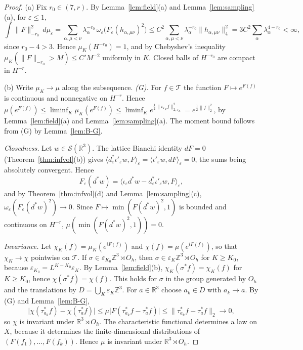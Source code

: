 \documentclass[11pt]{amsart}
\theoremstyle{plain}
\theoremstyle{definition}
\theoremstyle{remark}
\numberwithin{equation}{section}
\newcommand{\R}{\mathbb{R}}
\newcommand{\Z}{\mathbb{Z}}
\newcommand{\eps}{\varepsilon}
\newcommand{\cT}{\mathcal{T}}
\newcommand{\cS}{\mathcal{S}}
\newcommand{\Oh}{O_h}
\newcommand{\abs}[1]{\lvert #1\rvert}
\newcommand{\norm}[1]{\lVert #1\rVert}
\newcommand{\ip}[2]{\langle #1,#2\rangle}
\begin{document}
\begin{proof}
(a) Fix $r_0\in(7,r)$. By Lemma~\ref{lem:field}(a) and Lemma~\ref{lem:sampling}(a), for $\eps\le1$,
\[
\int\norm F_{-r_0}^2\,d\mu_\eps=\sum_{\alpha,\mu<\nu}\lambda_\alpha^{-r_0}\,\omega_\eps\big(F_\eps(h_{\alpha,\mu\nu})^2\big)\le C^2\sum_{\alpha,\mu<\nu}\lambda_\alpha^{-r_0}\norm{h_{\alpha,\mu\nu}}_4^2=3C^2\sum_\alpha\lambda_\alpha^{4-r_0}<\infty ,
\]
since $r_0-4>3$. Hence $\mu_K(H^{-r_0})=1$, and by Chebyshev's inequality $\mu_K(\norm F_{-r_0}>M)\le C'M^{-2}$ uniformly in $K$. Closed balls of $H^{-r_0}$ are compact in $H^{-r}$.

(b) Write $\mu_K\to\mu$ along the subsequence. \emph{(G).} For $f\in\cT$ the function $F\mapsto e^{F(f)}$ is continuous and nonnegative on $H^{-r}$. Hence $\mu(e^{F(f)})\le\liminf_K\mu_K(e^{F(f)})\le\liminf_Ke^{\frac12\norm{\iota_{\eps_K}f}^2_{2,\eps_K}}=e^{\frac12\norm f_2^2}$, by Lemma~\ref{lem:field}(a) and Lemma~\ref{lem:sampling}(a). The moment bound follows from (G) by Lemma~\ref{lem:B-G}.

\emph{Closedness.} Let $w\in\cS(\R^3)$. The lattice Bianchi identity $dF=0$ (Theorem~\ref{thm:infvol}(b)) gives $\ip{d_\eps^*\iota'_\eps w}F_\eps=\ip{\iota'_\eps w}{dF}_\eps=0$, the sums being absolutely convergent. Hence
\[
F_\eps(d^*w)=\ip{\iota_\eps d^*w-d^*_\eps\iota'_\eps w}{F}_\eps ,
\] and by Theorem~\ref{thm:infvol}(d) and Lemma~\ref{lem:sampling}(c), $\omega_\eps(F_\eps(d^*w)^2)\to0$. Since $F\mapsto\min(F(d^*w)^2,1)$ is bounded and continuous on $H^{-r}$, $\mu(\min(F(d^*w)^2,1))=0$.

\emph{Invariance.} Let $\chi_K(f)=\mu_K(e^{iF(f)})$ and $\chi(f)=\mu(e^{iF(f)})$, so that $\chi_K\to\chi$ pointwise on $\cT$. If $\sigma\in\eps_{K_0}\Z^3\rtimes\Oh$, then $\sigma\in\eps_K\Z^3\rtimes\Oh$ for $K\ge K_0$, because $\eps_{K_0}=L^{K-K_0}\eps_K$. By Lemma~\ref{lem:field}(b), $\chi_K(\sigma^*f)=\chi_K(f)$ for $K\ge K_0$, hence $\chi(\sigma^*f)=\chi(f)$. This holds for $\sigma$ in the group generated by $\Oh$ and the translations by $D=\bigcup_K\eps_K\Z^3$. For $a\in\R^3$ choose $a_k\in D$ with $a_k\to a$. By (G) and Lemma~\ref{lem:B-G},
\[
\abs{\chi(\tau_{a_k}^*f)-\chi(\tau_a^*f)}\le\mu\abs{F(\tau_{a_k}^*f-\tau_a^*f)}\le\norm{\tau_{a_k}^*f-\tau_a^*f}_2\to0 ,
\]
so $\chi$ is invariant under $\R^3\rtimes\Oh$. The characteristic functional determines a law on $X$, because it determines the finite-dimensional distributions of $(F(f_1),\dots,F(f_k))$. Hence $\mu$ is invariant under $\R^3\rtimes\Oh$.


\end{proof}
\end{document}
